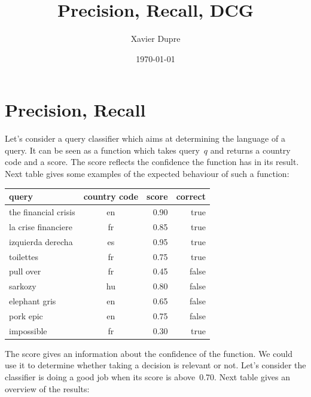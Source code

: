 

\ifnum{}
\title{Precision, Recall, DCG}
\author{Xavier Dupre}
\date{\today}
\maketitle
\setcounter{tocdepth}{3}

\tableofcontents

\bigskip
\fi

\section{Precision, Recall}

Let's consider a query classifier which aims at determining the language of a query. It can be seen as a function which takes query~$q$ and returns a country code and a score. The score reflects the confidence the function has in its result. Next table gives some examples of the expected behaviour of such a function:

\begin{center}\begin{tabular}{|l|c|r||r|}\hline
\textbf{query} & \textbf{country code} & \textbf{score} & \textbf{correct} \\ \hline
the financial crisis & en & 0.90 & true \\ 
la crise financiere & fr & 0.85 & true \\
izquierda derecha & es & 0.95 & true \\
toilettes  & fr & 0.75 & true \\
pull over & fr & 0.45 & false \\
sarkozy & hu & 0.80 & false \\
elephant gris & en & 0.65 & false \\
pork epic & en & 0.75 & false \\
impossible & fr & 0.30 & true \\ \hline
\end{tabular}\end{center}

The score gives an information about the confidence of the function. We could use it to determine whether taking a decision is relevant or not. Let's consider the classifier is doing a good job when its score is above~0.70. Next table gives an overview of the results:

